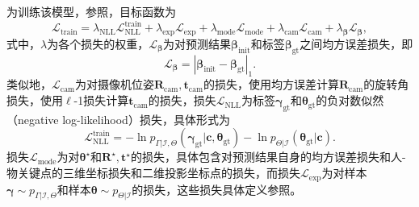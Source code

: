 为训练该模型，参照\citep{Kolotouros2021ProbabilisticMF}，目标函数为
\begin{equation}
	\mathcal{L}_{\text{train}} = \lambda_{\text{NLL}} \mathcal{L}_{\text{NLL}}^{\text{train}} + \lambda_{\text{exp}} \mathcal{L}_{\text{exp}} + \lambda_{\text{mode}} \mathcal{L}_{\text{mode}} + \lambda_{\text{cam}} \mathcal{L}_{\text{cam}} + \lambda_{\mathbf{\beta}} \mathcal{L}_{\mathbf{\beta}},
\end{equation}
式中，$\lambda$为各个损失的权重，$\mathcal{L}_{\mathbf{\beta}}$为对预测结果$\mathbf{\beta}_{\text{init}}$和标签$\mathbf{\beta}_{\text{gt}}$之间均方误差损失，即
\begin{equation}
	\mathcal{L}_{\mathbf{\beta}} = | \mathbf{\beta}_{\text{init}} - \mathbf{\beta}_{\text{gt}} |_1.
\end{equation}
类似地，$\mathcal{L}_{\text{cam}}$为对摄像机位姿$\mathbf{R}_{\text{cam}}, \mathbf{t}_{\text{cam}}$的损失，使用均方误差计算$\mathbf{R}_{\text{cam}}$的旋转角损失，使用$\ell$-1损失计算$\mathbf{t}_{\text{cam}}$的损失，损失$\mathcal{L}_{\text{NLL}}$为标签$\mathbf{\gamma}_{\text{gt}}$和$\mathbf{\theta}_{\text{gt}}$的负对数似然（negative log-likelihood）损失，具体形式为
\begin{equation}\label{eq:nll-train}
	\mathcal{L}_{\text{NLL}}^{\text{train}} = - \ln p_{\Gamma|\mathcal{I},\Theta}(\mathbf{\gamma}_{\text{gt}}|\mathbf{c}, \mathbf{\theta}_{\text{gt}}) - \ln p_{\Theta|\mathcal{I}}(\mathbf{\theta}_{\text{gt}}|\mathbf{c}).
\end{equation}
损失$\mathcal{L}_{\text{mode}}$为对$\mathbf{\theta}^\star$和$\mathbf{R}^\star, \mathbf{t}^\star$的损失，具体包含对预测结果自身的均方误差损失和人-物关键点的三维坐标损失和二维投影坐标点的损失，而损失$\mathcal{L}_{\text{exp}}$为对样本$\mathbf{\gamma} \sim p_{\Gamma|\mathcal{I},\Theta}$和样本$\mathbf{\theta}\sim p_{\Theta|\mathcal{I}}$的损失，这些损失具体定义参照\citep{Kolotouros2021ProbabilisticMF}。

